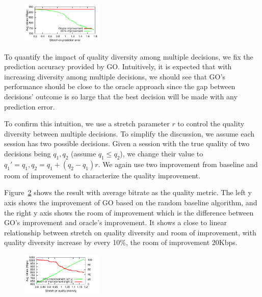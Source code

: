 \begin{figure}[h!]
\centering
 \includegraphics[width=0.35\textwidth] {figures/newfig/trendAccuracy-metricId1-keyGlobal-partition.pdf}
\label{fig:trace-accuracy-2}
\end{figure}




To quantify the impact of quality diversity among multiple decisions, we fix the prediction accuracy provided by GO. Intuitively, it is expected that with increasing diversity among multiple decisions, we should see that GO's performance should be close to the oracle approach since the gap between decisions' outcome is so large that the best decision will be made with any prediction error. 

To confirm this intuition, we use a stretch parameter $r$ to control the quality diversity between multiple decisions. To simplify the discussion, we assume each session has two possible decisions. Given a session with the true quality of two decisions being $q_1, q_2$ (assume $q_1\leq q_2$), we change their value to $q_1'=q_1, q_2=q_1+(q_2-q_1)r$. We again use two improvement from baseline and room of improvement to characterize the quality improvement.

Figure~\ref{fig:trace-diversity} shows the result with average bitrate as the quality metric. The left y axis shows the improvement of GO based on the random baseline algorithm, and the right y axis shows the room of improvement which is the difference between GO's improvement and oracle's improvement. It shows a close to linear relationship between stretch on quality diversity and room of improvement, with quality diversity increase by every 10\%, the room of improvement 20Kbps.

\begin{figure}[h!]
\centering
\includegraphics[width=0.35\textwidth] {figures/newfig/trendDiversity-metricId1-keyGlobal-partition.pdf}
\label{fig:trace-diversity}
\end{figure}


